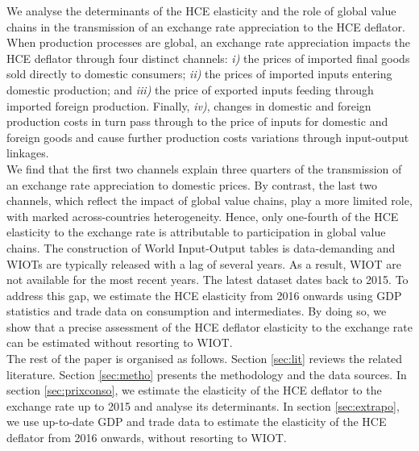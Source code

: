 \documentclass[12pt,a4paper]{paper}
\begin{document}
We analyse the determinants of the HCE elasticity and the role of global value chains in the transmission of an exchange rate appreciation to the HCE deflator. 
When production processes are global, an exchange rate appreciation impacts the HCE deflator through four distinct channels: \textit{i)} the prices of imported ﬁnal goods sold directly to domestic consumers;
\textit{ii)} the prices of imported inputs entering domestic production; and
\textit{iii)} the price of exported inputs feeding through imported foreign production.
Finally, \textit{iv)}, changes in domestic and foreign production costs in turn pass through to the price of inputs for domestic and foreign goods and cause further production costs variations through input-output linkages.\\
We find that the first two channels explain three quarters of the transmission of an exchange rate appreciation to domestic prices.
By contrast, the last two channels, which reflect the impact of global value chains, play a more limited role, with marked across-countries heterogeneity.
Hence, only one-fourth of the HCE elasticity to the exchange rate is attributable to participation in global value chains.
The construction of World Input-Output tables is data-demanding and WIOTs are typically released with a lag of several years.
As a result, WIOT are not available for the most recent years. The latest dataset dates back to 2015. 
To address this gap, we estimate the HCE elasticity from 2016 onwards using GDP statistics and trade data on consumption and intermediates.
By doing so, we show that a precise assessment of the HCE deflator elasticity to the exchange rate can be estimated without resorting to WIOT. \\
The rest of the paper is organised as follows.
Section \ref{sec:lit} reviews the related literature.
Section \ref{sec:metho} presents the methodology and the data sources.
In section \ref{sec:prixconso}, we estimate the elasticity of the HCE deflator to the exchange rate up to 2015 and analyse its determinants.
In section \ref{sec:extrapo}, we use up-to-date GDP and trade data to estimate the elasticity of the HCE deflator from 2016 onwards, without resorting to WIOT.


\end{document}
